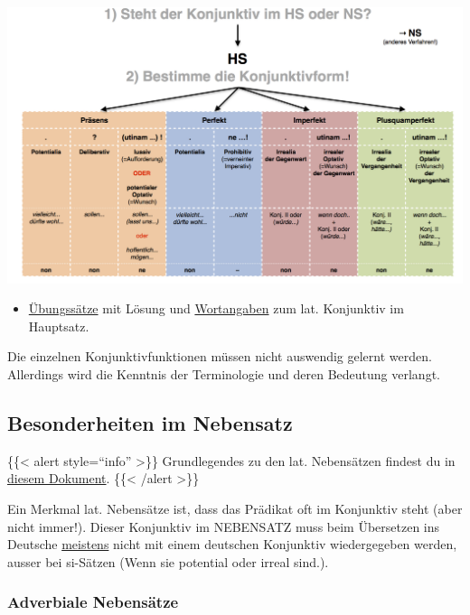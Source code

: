 \documentclass{scrartcl}
\begin{document}
\begin{center}
\includegraphics[width=.9\linewidth]{KonjHS.jpg}
\label{orgfaf7928}
\end{center} 

\begin{itemize}
\item \href{https://www.dropbox.com/s/sltkmozc04i5xwl/Konjunktiv.pdf?dl=0}{Übungssätze} mit Lösung und \href{https://www.dropbox.com/s/uicgeuj6n24kj97/Konjunktiv\_Wortangaben.pdf?dl=0}{Wortangaben} zum lat. Konjunktiv im
Hauptsatz.
\end{itemize}


Die einzelnen Konjunktivfunktionen müssen nicht auswendig gelernt werden.
Allerdings wird die Kenntnis der Terminologie und deren Bedeutung verlangt.


\subsection{Besonderheiten im Nebensatz}
\label{sec:org83cbee2}


\{\{< alert style="`info"' >\}\} Grundlegendes zu den lat. Nebensätzen findest du in \href{https://www.dropbox.com/s/fw6yy5i00lxn5iy/Lat\_Nebens\%25C3\%25A4tze.pdf?dl=0}{diesem Dokument}. \{\{< /alert >\}\}



Ein Merkmal lat. Nebensätze ist, dass das Prädikat oft im Konjunktiv
steht (aber nicht immer!). Dieser Konjunktiv im NEBENSATZ muss beim
Übersetzen ins Deutsche \uline{meistens} nicht mit einem deutschen Konjunktiv
wiedergegeben werden, ausser bei si-Sätzen (Wenn sie potential oder irreal sind.).

\subsubsection{Adverbiale Nebensätze}
\label{sec:org3888234}
\end{document}
